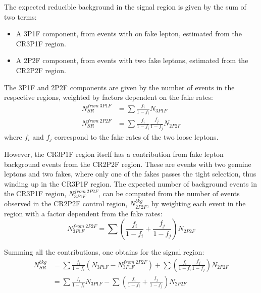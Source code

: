 The expected reducible background in the signal region is given by the sum of two terms:
\begin{itemize}
  \item A 3P1F component, from events with on fake lepton, estimated from the CR3P1F region.
  \item A 2P2F component, from events with two fake leptons, estimated from the CR2P2F region.
\end{itemize}

The 3P1F and 2P2F components are given by the number of events in the respective regions, weighted by factors dependent on the fake rates:
\begin{subequations}
  \begin{align}
    \label{eq:lepFR_3P1Fto4P}
    N^{from\ 3P1F}_{SR} &= \sum \frac{f_i}{1-f_i} N_{3P1F}
    \\
    \label{eq:lepFR_2P2Fto4P}
    N^{from\ 2P2F}_{SR} &= \sum \frac{f_i}{1-f_i} \frac{f_j}{1-f_j} N_{2P2F}
  \end{align}
\end{subequations}
where $f_i$ and $f_j$ correspond to the fake rates of the two loose leptons.

However, the CR3P1F region itself has a contribution from fake lepton background events from the CR2P2F region.
These are events with two genuine leptons and two fakes, where only one of the fakes passes the tight selection, thus winding up in the CR3P1F region.
The expected number of background events in the CR3P1F region, $N^{from\ 2P2F}_{3P1F}$,
can be computed from the number of events observed in the CR2P2F control region, $N^{bkg}_{2P2F}$,
by weighting each event in the region with a factor dependent from the fake rates:
\begin{equation}
  \label{eq:lepFR_N3P1F}
  N^{from\ 2P2F}_{3P1F} = \sum \left( \frac{f_i}{1-f_i} + \frac{f_j}{1-f_j} \right) N_{2P2F}
\end{equation}

Summing all the contributions, one obtains for the signal region:
\begin{equation}
  \begin{split}
    \label{eq:lepFR_4P}
    N^{bkg}_{SR} &= \sum \frac{f_i}{1-f_i} \left( N_{3P1F} - N^{from\ 2P2F}_{3P1F} \right) + \sum \left( \frac{f_i}{1-f_i} \frac{f_j}{1-f_j} \right) N_{2P2F}
    \\
    &= \sum \frac{f_i}{1-f_i} N_{3P1F} - \sum \left( \frac{f_i}{1-f_i} + \frac{f_j}{1-f_j} \right) N_{2P2F}
  \end{split}
\end{equation}

